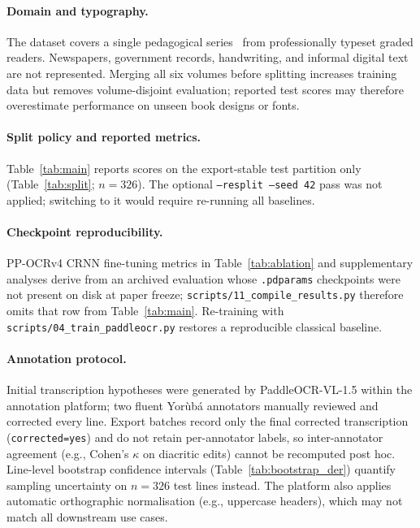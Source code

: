 \documentclass{article}
\newcommand{\Yoruba}{Yor\`ub\'a}
\begin{document}
\paragraph{Domain and typography.}
The dataset covers a single pedagogical series~\cite{oyedele2020ydw} from professionally typeset graded readers. Newspapers, government records, handwriting, and informal digital text are not represented. Merging all six volumes before splitting increases training data but removes volume-disjoint evaluation; reported test scores may therefore overestimate performance on unseen book designs or fonts.

\paragraph{Split policy and reported metrics.}
Table~\ref{tab:main} reports scores on the export-stable test partition only (Table~\ref{tab:split}; $n{=}326$). The optional \texttt{--resplit --seed 42} pass was not applied; switching to it would require re-running all baselines.

\paragraph{Checkpoint reproducibility.}
PP-OCRv4 CRNN fine-tuning metrics in Table~\ref{tab:ablation} and supplementary analyses derive from an archived evaluation whose \texttt{.pdparams} checkpoints were not present on disk at paper freeze; \texttt{scripts/11\_compile\_results.py} therefore omits that row from Table~\ref{tab:main}. Re-training with \texttt{scripts/04\_train\_paddleocr.py} restores a reproducible classical baseline.

\paragraph{Annotation protocol.}
Initial transcription hypotheses were generated by PaddleOCR-VL-1.5 within the annotation platform; two fluent \Yoruba{} annotators manually reviewed and corrected every line. Export batches record only the final corrected transcription (\texttt{corrected=yes}) and do not retain per-annotator labels, so inter-annotator agreement (e.g., Cohen's $\kappa$ on diacritic edits) cannot be recomputed post hoc. Line-level bootstrap confidence intervals (Table~\ref{tab:bootstrap_der}) quantify sampling uncertainty on $n{=}326$ test lines instead. The platform also applies automatic orthographic normalisation (e.g., uppercase headers), which may not match all downstream use cases.
\end{document}
